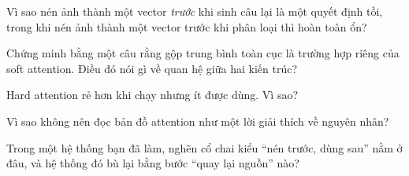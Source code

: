 \documentclass[../../../deep_learning.tex]{subfiles}
\begin{document}
\begin{tukiem}
\item Vì sao nén ảnh thành một vector \emph{trước} khi sinh câu lại là một quyết định tồi, trong khi nén ảnh thành một vector trước khi phân loại thì hoàn toàn ổn?
\item Chứng minh bằng một câu rằng gộp trung bình toàn cục là trường hợp riêng của soft attention. Điều đó nói gì về quan hệ giữa hai kiến trúc?
\item Hard attention rẻ hơn khi chạy nhưng ít được dùng. Vì sao?
\item Vì sao không nên đọc bản đồ attention như một lời giải thích về nguyên nhân?
\item Trong một hệ thống bạn đã làm, nghẽn cổ chai kiểu ``nén trước, dùng sau'' nằm ở đâu, và hệ thống đó bù lại bằng bước ``quay lại nguồn'' nào?
\end{tukiem}
\ifSubfilesClassLoaded{\printbibliography[title={Nguồn}]}{}
\end{document}
